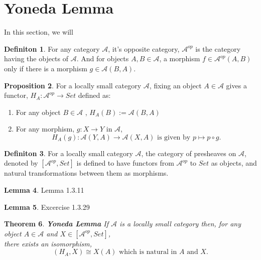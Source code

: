 \documentclass[18pt,a4paper]{article}
\newtheorem{theorem}{Theorem}[section]
\theoremstyle{definition}
\newtheorem{definition}[theorem]{Definiton}
\newtheorem{lemma}[theorem]{Lemma}
\newtheorem{proop}[theorem]{Proposition}
\begin{document}
\section{Yoneda Lemma} %
In this section, we will



\begin{definition} %
For any category $\mathcal{A} $, it's opposite category, $\mathcal{A}^{op}$
is the category having the objects of $\mathcal{A}$.
And for objects $A,B \in \mathcal{A} $, a morphism $f \in \mathcal{A}^{op} (A,B)$
only if there is a morphism $g \in \mathcal{A}(B,A)$.
\end{definition}
\begin{proop} %
	For a locally small category $\mathcal{A}$, fixing an object $A \in \mathcal{A} $ gives
	a functor, $H_A: \mathcal{A} ^{op} \rightarrow Set$ defined as:
	\begin{enumerate}[label=(\roman*)]
		\item For any object $B \in \mathcal{A} $ , $H_A(B):=\mathcal{A} (B,A)$
		\item For any morphism, $g : X \rightarrow Y $ in $\mathcal{A}$,
			\[H_A(g): \mathcal{A} (Y,A) \rightarrow \mathcal{A}(X,A)
				\text{ is given by } p \mapsto p \circ g.\]
	\end{enumerate}
\end{proop}
\begin{definition} %
	For a locally small category $\mathcal{A} $, the category of presheaves on $\mathcal{A} $, denoted by $[\mathcal{A} ^{op},Set]$
	is defined to have functors from $\mathcal{A} ^{op}$ to $Set$ as objects,
	and natural transformations between them as morphisms.
\end{definition}

\begin{lemma}
	Lemma 1.3.11
\end{lemma}
\begin{lemma}
	Excercise 1.3.29
\end{lemma}

\begin{theorem}{\textbf{Yoneda Lemma}} %
	If $\mathcal{A} $ is a locally small category then, for any object $A \in \mathcal{A} $
	and $X \in [ \mathcal{A}^{op},Set]$,\\ there exists an isomorphism,
	\begin{equation} [ \mathcal{A} ^{op},Set ](H_A,X)\cong X(A) \text{ which is natural in } A \text{ and } X.\end{equation}
\end{theorem}
\end{document}
